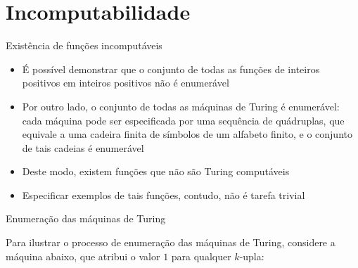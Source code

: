 \section{Incomputabilidade}

\begin{frame}[fragile]{Existência de funções incomputáveis}

    \begin{itemize}
        \item É possível demonstrar que o conjunto de todas as funções de inteiros positivos em
            inteiros positivos não é enumerável

        \item Por outro lado, o conjunto de todas as máquinas de Turing é enumerável: cada 
            máquina pode ser especificada por uma sequência de quádruplas, que equivale a 
            uma cadeira finita de símbolos de um alfabeto finito, e o conjunto de tais cadeias
            é enumerável

        \item Deste modo, existem funções que não são Turing computáveis

        \item Especificar exemplos de tais funções, contudo, não é tarefa trivial
    \end{itemize}

\end{frame}

\begin{frame}[fragile]{Enumeração das máquinas de Turing}

    Para ilustrar o processo de enumeração das máquinas de Turing, considere a máquina abaixo,
    que atribui o valor $1$ para qualquer $k$-upla:

    \vspace{0.3in}

    \begin{figure}[h]
        \centering
    \end{figure}

\end{frame}

